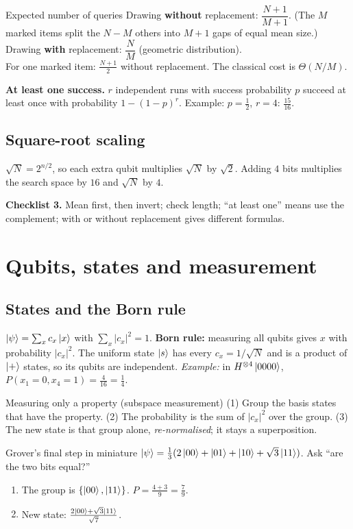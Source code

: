 \documentclass[11pt,a4paper,openany]{book}
\newcounter{wex}[section]
\newenvironment{steps}{\begin{enumerate}[label=\textbf{Step \arabic*.}, leftmargin=4.2em, itemsep=2pt]}{\end{enumerate}}
\begin{document}
\begin{keyres}{Expected number of queries}
Drawing \textbf{without} replacement: $\dfrac{N + 1}{M + 1}$. (The $M$ marked items split the $N - M$ others into $M + 1$ gaps of equal mean size.) \\[2pt]
Drawing \textbf{with} replacement: $\dfrac{N}{M}$ (geometric distribution). \\[2pt]
For one marked item: $\frac{N+1}{2}$ without replacement. The classical cost is $\Theta(N/M)$.
\end{keyres}
\textbf{At least one success.} $r$ independent runs with success probability $p$ succeed at least once with probability $1 - (1-p)^r$. Example: $p = \frac12$, $r = 4$: $\frac{15}{16}$.

\subsection{Square-root scaling}
$\sqrt{N} = 2^{n/2}$, so each extra qubit multiplies $\sqrt N$ by $\sqrt2$. Adding $4$ bits multiplies the search space by $16$ and $\sqrt N$ by $4$.

\textbf{Checklist 3.} Mean first, then invert; check length; ``at least one'' means use the complement; with or without replacement gives different formulas.

\section{Qubits, states and measurement}
\subsection{States and the Born rule}
$\ket\psi = \sum_x c_x\ket{x}$ with $\sum_x|c_x|^2 = 1$. \textbf{Born rule:} measuring all qubits gives $x$ with probability $|c_x|^2$. The uniform state $\ket{s}$ has every $c_x = 1/\sqrt N$ and is a product of $\ket{+}$ states, so its qubits are independent.
\emph{Example:} in $H^{\otimes4}\ket{0000}$, $P(x_1 = 0, x_4 = 1) = \frac{4}{16} = \frac14$.

\begin{method}{Measuring only a property (subspace measurement)}
(1) Group the basis states that have the property. (2) The probability is the sum of $|c_x|^2$ over the group. (3) The new state is that group alone, \emph{re-normalised}; it stays a superposition.
\end{method}
\begin{wexample}{Grover's final step in miniature}
$\ket\psi = \frac13(2\ket{00} + \ket{01} + \ket{10} + \sqrt3\ket{11})$. Ask ``are the two bits equal?''
\begin{steps}
\item The group is $\{\ket{00}, \ket{11}\}$. $P = \frac{4 + 3}{9} = \frac79$.
\item New state: $\frac{2\ket{00} + \sqrt3\ket{11}}{\sqrt7}$.
\end{steps}
\end{wexample}
\end{document}
